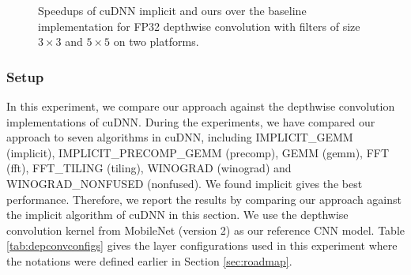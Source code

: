 \begin{figure}[!t]
{	\label{fig:dwspeedupjetsonf5}}
\caption{Speedups of cuDNN implicit and ours over the baseline implementation for FP32 depthwise convolution with filters of size $3 \times 3$ and $5 \times 5$ on two platforms.} \label{fig:dwspeedup}
\end{figure}


%	
%


\subsubsection{Setup} In this experiment, we compare our approach against the depthwise convolution implementations of cuDNN.
During the experiments, we have compared our approach to seven algorithms in cuDNN, including IMPLICIT\_GEMM (implicit),
IMPLICIT\_PRECOMP\_GEMM (precomp), GEMM (gemm), FFT (fft), FFT\_TILING (tiling), WINOGRAD (winograd) and WINOGRAD\_NONFUSED (nonfused). We
found implicit gives the best performance. Therefore, we report the results by comparing our approach against  the implicit algorithm of
cuDNN in this section. We use the depthwise convolution kernel from MobileNet (version 2) as our reference CNN model. Table
\ref{tab:depconvconfigs} gives the layer configurations used in this experiment where the notations were defined earlier in Section
\ref{sec:roadmap}.

